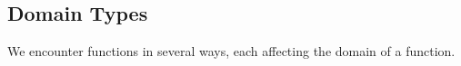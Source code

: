\documentclass{ximera}
\begin{document}
\subsection*{Domain Types}

We encounter functions in several ways, each affecting the domain of a function.
\end{document}
